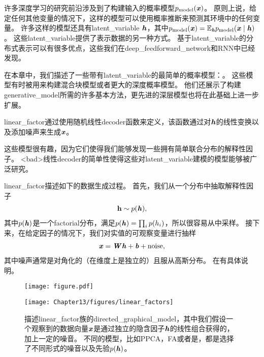 \chapter{}
\label{chap:linear_factor_models}




许多深度学习的研究前沿涉及到了构建输入的概率模型$p_{\text{model}}(\boldsymbol{\mathit{x}})$。
原则上说，给定任何其他变量的情况下，这样的模型可以使用概率推断来预测其环境中的任何变量。
许多这样的模型还具有\gls{latent_variable} $\boldsymbol{\mathit{h}}$，其中$p_{\text{model}}(\boldsymbol{\mathit{x}}) = \mathbb{E}_{\boldsymbol{\mathit{h}}} p_{\text{model}}(\boldsymbol{\mathit{x}}\mid\boldsymbol{\mathit{h}})$。
这些\gls{latent_variable}提供了表示数据的另一种方式。
 基于\gls{latent_variable}的分布式表示可以有很多优点，这些我们在\gls{deep_feedforward_network}和\gls{RNN}中已经发现。


在本章中，我们描述了一些带有\gls{latent_variable}的最简单的概率模型：。
这些模型有时被用来构建混合块模型\citep{Hinton-nips95,ghahramani96em,Roweis+Saul+Hinton-2002}或者更大的深度概率模型\citep{tang2012deep}。
他们还展示了构建\gls{generative_model}所需的许多基本方法，更先进的深层模型也将在此基础上进一步扩展。


\gls{linear_factor}通过使用随机线性\gls{decoder}函数来定义，该函数通过对$\boldsymbol{\mathit{h}}$的线性变换以及添加噪声来生成$\boldsymbol{\mathit{x}}$。


这些模型很有趣，因为它们使得我们能够发现一些拥有简单联合分布的解释性因子。 
<bad>线性\gls{decoder}的简单性使得这些对\gls{latent_variable}建模的模型能够被广泛研究。


\gls{linear_factor}描述如下的数据生成过程。 
首先，我们从一个分布中抽取解释性因子
\begin{align}
\label{eqn:131}
\mathbf{h} \sim p(\boldsymbol{\mathit{h}}),
\end{align}
其中$p(\boldsymbol{\mathit{h}})$是一个\gls{factorial}分布，满足$p(\boldsymbol{\mathit{h}}) = \prod_{i}^{}p(h_i)$，所以很容易从中采样。
接下来，在给定因子的情况下，我们对实值的可观察变量进行抽样
\begin{align}
\label{eqn:132}
\boldsymbol{\mathit{x}} = \boldsymbol{\mathit{W}} \boldsymbol{\mathit{h}} + \boldsymbol{\mathit{b}} + \text{noise},
\end{align}
其中噪声通常是对角化的（在维度上是独立的）且服从高斯分布。
在有具体说明。

\begin{figure}[!htb]
\ifOpenSource
\centerline{\texttt{[image: figure.pdf]}}
\else
	\centerline{\texttt{[image: Chapter13/figures/linear\_factors]}}
\fi
	\caption{描述\gls{linear_factor}族的\gls{directed_graphical_model}，其中我们假设一个观察到的数据向量$\boldsymbol{\mathit{x}}$是通过独立的隐含因子$\boldsymbol{\mathit{h}}$的线性组合获得的，加上一定的噪音。
		不同的模型，比如\gls{PPCA}，\gls{FA}或者是，都是选择了不同形式的噪音以及先验$p(\boldsymbol{\mathit{h}})$。}
	\label{fig:linear_factors}
\end{figure}


